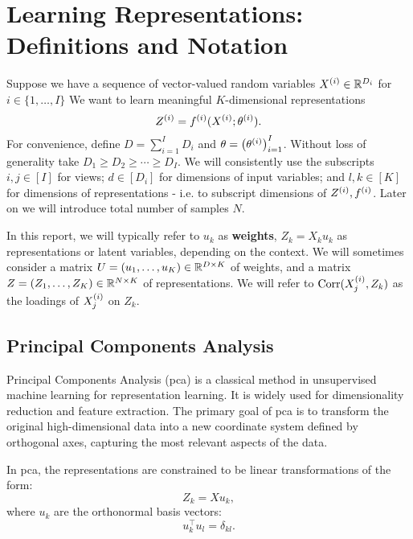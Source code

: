 \section{Learning Representations: Definitions and Notation}

Suppose we have a sequence of vector-valued random variables $X^{(i)} \in \mathbb{R}^{D_i}$ for $i \in \{1, \dots, I \}$
We want to learn meaningful $K$-dimensional representations
\begin{equation}\label{eq:general-form-of-representations}
    Z^{(i)} = f^{(i)}( X^{(i)}; \theta^{(i)}).
\end{equation}
For convenience, define $D = \sum_{i=1}^I D_i$ and $\theta = \left(\theta^{(i)}\right)_{i=1}^I$.
Without loss of generality take $D_1 \geq D_2 \geq \cdots \geq D_I$.
We will consistently use the subscripts $i,j \in [I]$ for \gls{views};
$d \in [D_i]$ for dimensions of input variables;
and $l,k \in [K]$ for dimensions of representations - i.e. to subscript dimensions of $Z^{(i)}, f^{(i)}$.
Later on we will introduce total number of samples $N$.

In this report, we will typically refer to $u_k$ as \textbf{\gls{weights}}, $Z_k = X_k u_k$ as \gls{representations} or \gls{latent variables}, depending on the context. We will sometimes consider a
matrix $U = \left(u_1, \dots, u_K\right) \in \mathbb{R}^{D \times K}$ of \gls{weights}, and a
matrix $Z = \left(Z_1, \dots, Z_K\right) \in \mathbb{R}^{N \times K}$ of representations.
We will refer to $\operatorname{Corr}(X^{(i)}_j, Z_k)$ as the loadings of $X^{(i)}_j$ on $Z_k$.

\subsection{Principal Components Analysis}

Principal Components Analysis\cite{hotelling1933analysis} (\acrshort{pca}) is a classical method in unsupervised machine learning for representation learning.
It is widely used for dimensionality reduction and feature extraction.
The primary goal of \acrshort{pca} is to transform the original high-dimensional data into a new coordinate system defined by orthogonal axes, capturing the most relevant aspects of the data.

In \acrshort{pca}, the representations are constrained to be linear transformations of the form:
\begin{equation}\label{eq:pca-linear-function-def}
    Z_k = X u_k,
\end{equation}
where $u_k$ are the orthonormal basis vectors:
\begin{equation}\label{eq:pca-orthonormality-constraint}
    u_k^\top u_l = \delta_{kl}.
\end{equation}

